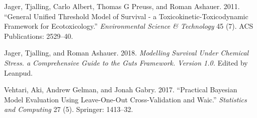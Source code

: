 \documentclass[fleqn,10pt,lineno]{wlpeerj} %
\begin{document}
\hypertarget{ref-Jager2011}{}
Jager, Tjalling, Carlo Albert, Thomas G Preuss, and Roman Ashauer. 2011.
``General Unified Threshold Model of Survival - a
Toxicokinetic-Toxicodynamic Framework for Ecotoxicology.''
\emph{Environmental Science \& Technology} 45 (7). ACS Publications:
2529--40.

\hypertarget{ref-Jager2018GUTSbook}{}
Jager, Tjalling, and Roman Ashauer. 2018. \emph{Modelling Survival Under
Chemical Stress. a Comprehensive Guide to the Guts Framework. Version
1.0.} Edited by Leanpud.

\hypertarget{ref-Vehtari2017}{}
Vehtari, Aki, Andrew Gelman, and Jonah Gabry. 2017. ``Practical Bayesian
Model Evaluation Using Leave-One-Out Cross-Validation and Waic.''
\emph{Statistics and Computing} 27 (5). Springer: 1413--32.
\end{document}
